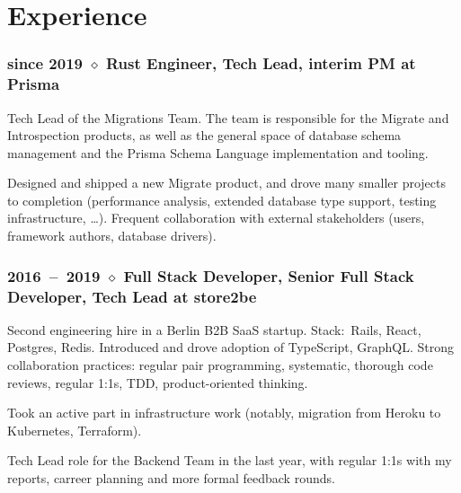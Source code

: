 \documentclass[10pt]{article}
\newcommand{\setparskip}{\setlength{\parskip}{.3em}}
\begin{document}
\begin{minipage}[t]{0.54\textwidth}
  \setparskip

  \section*{Experience}

  \subsubsection*{since 2019 $\diamond$ Rust Engineer, Tech Lead, interim PM at Prisma}

    \vspace{-0.8em}

    Tech Lead of the Migrations Team. The team is responsible for the Migrate
    and Introspection products, as well as the general space of database schema
    management and the Prisma Schema Language implementation and tooling.

    Designed and shipped a new Migrate product, and drove many smaller projects to completion (performance analysis, extended database type support, testing infrastructure, …). Frequent collaboration with external stakeholders (users, framework authors, database drivers).

    \vspace{-0.5em}

    \subsubsection*{2016~--~2019 $\diamond$ Full Stack Developer, Senior Full Stack Developer, Tech Lead at store2be}

    \vspace{-0.8em}

    Second engineering hire in a Berlin B2B SaaS startup. Stack:~Rails, React,
    Postgres, Redis. Introduced and drove adoption of
    TypeScript, GraphQL. Strong collaboration practices: regular pair programming, systematic, thorough code reviews, regular 1:1s, TDD, product-oriented thinking.

    Took an active part in infrastructure work (notably, migration from Heroku
    to Kubernetes, Terraform).

    Tech Lead role for the Backend Team in the last year, with regular 1:1s with
    my reports, carreer planning and more formal feedback rounds.

    \vspace{-0.5em}


\end{minipage}
\end{document}

